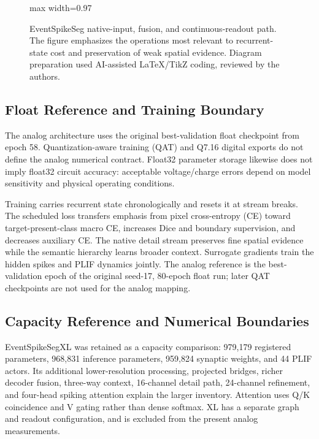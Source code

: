 \documentclass[preprint,12pt,number]{elsarticle}
\newcommand{\FigureHeaderFont}{\fontsize{9.7}{11.0}\selectfont\bfseries}
\newcommand{\panelbg}[4]{%
  \begin{scope}[on background layer]
    \node[fit=#1, rounded corners=8pt, fill=#2, draw=#3, line width=1.15pt, inner sep=8pt] (#4) {};
  \end{scope}}
\newcommand{\panelheader}[4]{%
  \node[fill=#2, rounded corners=4pt, minimum width=#4, minimum height=8mm, anchor=south west] (#1hdr) at ($(#1.north west)+(0mm,1.5mm)$) {};
  \node[font=\FigureHeaderFont,text=white,anchor=west] at ($(#1hdr.west)+(4mm,0)$) {#3};}
\begin{document}
\begin{figure}[!t]
\begin{adjustbox}{max width=0.97\textwidth}
\end{adjustbox}
\caption{EventSpikeSeg native-input, fusion, and continuous-readout path. The figure emphasizes the operations most relevant to recurrent-state cost and preservation of weak spatial evidence. Diagram preparation used AI-assisted LaTeX/TikZ coding, reviewed by the authors.}
\label{fig:eventspikeseg_path}
\end{figure}

\subsection{Float Reference and Training Boundary}
The analog architecture uses the original best-validation float checkpoint from epoch 58. Quantization-aware training (QAT) and Q7.16 digital exports do not define the analog numerical contract. Float32 parameter storage likewise does not imply float32 circuit accuracy: acceptable voltage/charge errors depend on model sensitivity and physical operating conditions.

Training carries recurrent state chronologically and resets it at stream breaks. The scheduled loss transfers emphasis from pixel cross-entropy (CE) toward target-present-class macro CE, increases Dice and boundary supervision, and decreases auxiliary CE. The native detail stream preserves fine spatial evidence while the semantic hierarchy learns broader context. Surrogate gradients train the hidden spikes and PLIF dynamics jointly. The analog reference is the best-validation epoch of the original seed-17, 80-epoch float run; later QAT checkpoints are not used for the analog mapping.

\subsection{Capacity Reference and Numerical Boundaries}
EventSpikeSegXL was retained as a capacity comparison: 979,179 registered parameters, 968,831 inference parameters, 959,824 synaptic weights, and 44 PLIF actors. Its additional lower-resolution processing, projected bridges, richer decoder fusion, three-way context, 16-channel detail path, 24-channel refinement, and four-head spiking attention explain the larger inventory. Attention uses Q/K coincidence and V gating rather than dense softmax. XL has a separate graph and readout configuration, and is excluded from the present analog measurements.
\end{document}
